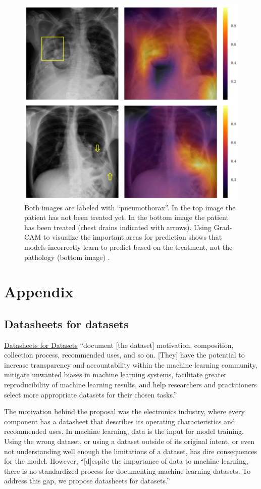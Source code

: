\documentclass{article}
\begin{document}
\begin{figure}[!htb]
    \centering
    \includegraphics[width=0.7\columnwidth]{figures/chestX-ray8-pneumothorax-with-drain.png}
    \caption[Model erroneously picking up chest drains as main feature of ``pneumothorax''.]{Both images are labeled with ``pneumothorax''. In the top image the patient has not been treated yet. In the bottom image the patient has been treated (chest drains indicated with arrows). Using Grad-CAM \cite{Selvaraju2019} to visualize the important areas for prediction shows that models incorrectly learn to predict based on the treatment, not the pathology (bottom image) \cite{Baltruschat2019}.}
    \label{fig:chestX-ray8-pneumothorax-with-drain}
\end{figure}

\section{Appendix}

\subsection{Datasheets for datasets}

\href{https://arxiv.org/abs/1803.09010}{Datasheets for Datasets} ``document [the dataset] motivation, composition, collection process, recommended uses, and so on. [They] have the potential to increase transparency and accountability within the machine learning community, mitigate unwanted biases in machine learning systems, facilitate greater reproducibility of machine learning results, and help researchers and practitioners select more appropriate datasets for their chosen tasks.''

The motivation behind the proposal was the electronics industry, where every component has a datasheet that describes its operating characteristics and recommended uses. In machine learning, data is the input for model training. Using the wrong dataset, or using a dataset outside of its original intent, or even not understanding well enough the limitations of a dataset, has dire consequences for the model. However, ``[d]espite the importance of data to machine learning, there is no standardized process for documenting machine learning datasets. To address this gap, we propose datasheets for datasets.''
\end{document}
